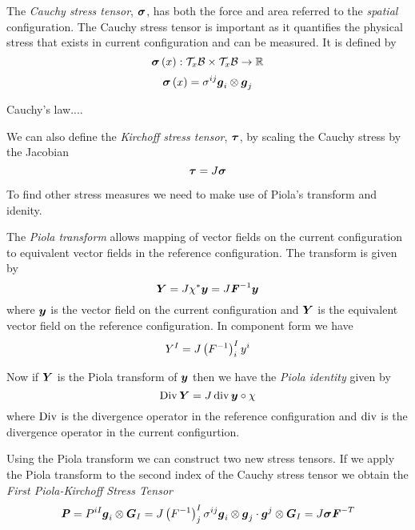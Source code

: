 The \emph{Cauchy stress tensor}, $\tensor{\sigma}$, has both the force and
area referred to the \emph{spatial} configuration. The Cauchy stress tensor is
important as it quantifies the physical stress that exists in current
configuration and can be measured. It is defined by
\begin{equation}
  \mapping{\fnof{\tensor{\sigma}}{x}}{\spaceprod{\tangentspace{\embedmanifold{B}}{x}}{\tangentspace{\embedmanifold{B}}{x}}}{\realnums}
\end{equation}
\ie
\begin{equation}
  \fnof{\tensor{\sigma}}{x}=\sigma^{ij}\tensorprod{\vectr{g}_{i}}{\vectr{g}_{j}}
\end{equation}

Cauchy's law....

We can also define the \emph{Kirchoff stress tensor}, $\tensor{\tau}$, by
scaling the Cauchy stress by the Jacobian \ie{}
\begin{equation}
  \tensor{\tau}=J\tensor{\sigma}
\end{equation}

To find other stress measures we need to make use of Piola's transform and
idenity.

The \emph{Piola transform} allows mapping of vector fields on the current
configuration to equivalent vector fields in the reference configuration. The
transform is given by
\begin{equation}
  \vectr{Y}=J\pullback{\chi}{\vectr{y}}=J\inverse{\tensor{F}}\vectr{y}
\end{equation}
where $\vectr{y}$ is the vector field on the current configuration and
$\vectr{Y}$ is the equivalent vector field on the reference configuration. In
component form we have
\begin{equation}
  Y^{I}=J\pbrac{\inverse{F}}^{I}_{i}y^{i}
\end{equation}

Now if $\vectr{Y}$ is the Piola transform of $\vectr{y}$ then we have the
\emph{Piola identity} given by
\begin{equation}
  \Divop{\vectr{Y}}=J\divop{\circcomposition{\vectr{y}}{\chi}}
\end{equation}
where $\Divop$ is the divergence operator in the reference configuration and
$\divop$ is the divergence operator in the current configurtion. 

Using the Piola transform we can construct two new stress tensors. If we apply
the Piola transform to the second index of the Cauchy stress tensor we obtain
the \emph{First Piola-Kirchoff Stress Tensor} \ie{}
\begin{equation}
  \tensor{P}=P^{iI}\tensorprod{\vectr{g}_{i}}{\vectr{G}_{I}}=J\pbrac{\inverse{F}}^{I}_{j}\sigma^{ij}\dotprod{\tensorprod{\vectr{g}_{i}}{\vectr{g}_{j}}}{\tensorprod{\vectr{g}^{j}}{\vectr{G}_{I}}}=J\tensor{\sigma}\invtranspose{\tensor{F}}
\end{equation}

